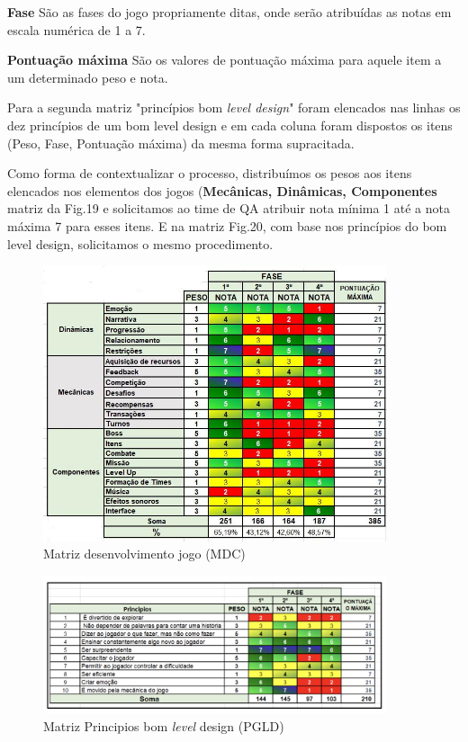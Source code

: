 \documentclass[12pt, onecolumn]{IEEEtran}
\begin{document}
\textbf{Fase}
São as fases do jogo propriamente ditas, onde serão atribuídas as notas em escala numérica de 1 a 7.

\textbf{Pontuação máxima}
São os valores de pontuação máxima para aquele item a um determinado peso e nota.

Para a segunda matriz "princípios bom \textit{level design}" foram elencados nas linhas os dez princípios de um bom level design  e em cada coluna foram dispostos os itens (Peso, Fase, Pontuação máxima) da mesma forma supracitada.

Como forma de contextualizar o processo, distribuímos os pesos aos itens elencados nos elementos dos jogos (\textbf{Mecânicas, Dinâmicas, Componentes} matriz da Fig.19 e  solicitamos ao time de QA atribuir nota mínima 1 até a nota máxima 7 para esses itens. E na matriz Fig.20, com base nos princípios do bom level design, solicitamos o mesmo procedimento. 

\begin{figure}[H]
    \centering
    \includegraphics[width=0.9\textwidth]{imagens/resultado-DMC.jpeg}
    \caption{Matriz desenvolvimento jogo (MDC)}
    \label{fig:mesh1}
\end{figure}

\begin{figure}[H]
    \centering
    \includegraphics[width=0.9\textwidth]{imagens/conclusao-4.png}
    \caption{Matriz Principios bom \textit{level} design (PGLD)}
    \label{fig:mesh1}
\end{figure}
\end{document}
